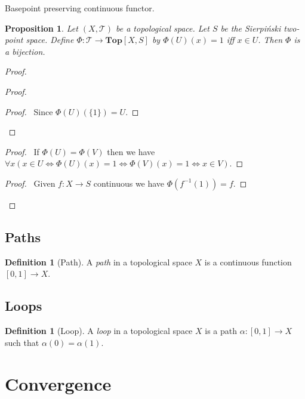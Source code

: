 \documentclass{book}
\let\qed\relax
\newtheorem{prop}[ax]{Proposition}
\theoremstyle{definition}
\newtheorem{df}[ax]{Definition}
\newcommand{\inv}[1]{\ensuremath{{#1}^{-1}}}
\newcommand{\Top}{\ensuremath{\mathbf{Top}}}
\begin{document}
Basepoint preserving continuous functor.

\begin{prop}
Let $(X, \mathcal{T})$ be a topological space. Let $S$ be the Sierpi\'{n}ski two-point space. Define $\Phi : \mathcal{T} \rightarrow \Top[X,S]$ by $\Phi(U)(x) = 1$ iff $x \in U$. Then $\Phi$ is a bijection.
\end{prop}

\begin{proof}
\pf
{}
\begin{proof}
	\begin{proof}
		\pf\ Since $\Phi(U)(\{1\}) = U$.
	\end{proof}
\end{proof}
\begin{proof}
	\pf\ If $\Phi(U) = \Phi(V)$ then we have $\forall x (x \in U \Leftrightarrow \Phi(U)(x) = 1 \Leftrightarrow \Phi(V)(x) = 1 \Leftrightarrow x \in V)$.
\end{proof}
\begin{proof}
	\pf\ Given $f : X \rightarrow S$ continuous we have $\Phi(\inv{f}(1)) = f$.
\end{proof}
\qed
\end{proof}

\subsection{Paths}

\begin{df}[Path]
A \emph{path} in a topological space $X$ is a continuous function $[0,1] \rightarrow X$.
\end{df}

\subsection{Loops}

\begin{df}[Loop]
A \emph{loop} in a topological space $X$ is a path $\alpha : [0,1] \rightarrow X$ such that $\alpha(0) = \alpha(1)$.
\end{df}

\section{Convergence}
\end{document}

